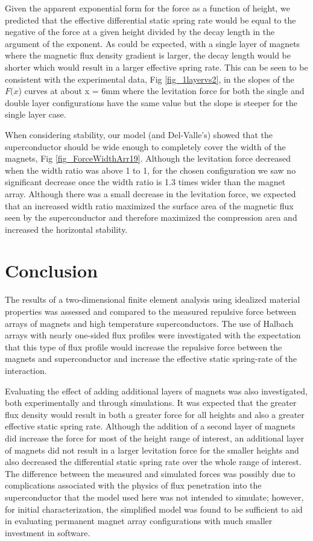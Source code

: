 Given the apparent exponential form for the force as a function of height, we predicted that the effective differential static spring rate would be equal to the negative of the force at a given height divided by the decay length in the argument of the exponent. As could be expected, with a single layer of magnets where the magnetic flux density gradient is larger, the decay length would be shorter which would result in a larger effective spring rate. This can be seen to be consistent with the experimental data, Fig \ref{fig_1layervs2}, in the slopes of the $F(x$) curves at about x = 6mm where the levitation force for both the single and double layer configurations have the same value but the slope is steeper for the single layer case.

When considering stability, our model (and Del-Valle's) showed that the superconductor should be wide enough to completely cover the width of the magnets, Fig \ref{fig_ForceWidthArr19}.  Although the levitation force decreased when the width ratio was above 1 to 1, for the chosen configuration we saw no significant decrease once the width ratio is 1.3 times wider than the magnet array.  Although there was a small decrease in the levitation force, we expected that an increased width ratio maximized the surface area of the magnetic flux seen by the superconductor and therefore maximized the compression area and increased the horizontal stability.  

\section{Conclusion}

The results of a two-dimensional finite element analysis using idealized material properties was assessed and compared to the measured repulsive force between arrays of magnets and high temperature superconductors. The use of Halbach arrays with nearly one-sided flux profiles were investigated with the expectation that this type of flux profile would increase the repulsive force between the magnets and superconductor and increase the effective static spring-rate of the interaction. 

Evaluating the effect of adding additional layers of magnets was also investigated, both experimentally and through simulations. It was expected that the greater flux density would result in both a greater force for all heights and also a greater effective static spring rate. Although the addition of a second layer of magnets did increase the force for most of the height range of interest, an additional layer of magnets did not result in a larger levitation force for the smaller heights and also decreased the differential static spring rate over the whole range of interest. The difference between the measured and simulated forces was possibly due to complications associated with the physics of flux penetration into the superconductor that the model used here was not intended to simulate; however, for initial characterization, the simplified model was found to be sufficient to aid in evaluating permanent magnet array configurations with much smaller investment in software.

